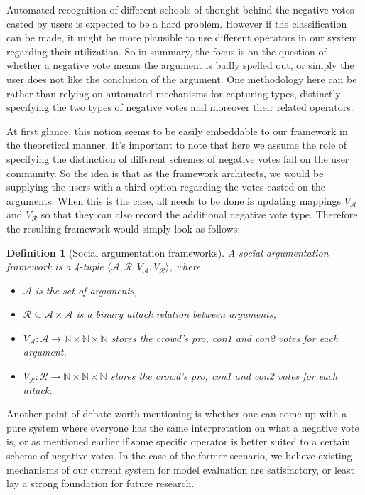 \documentclass{article}
\newtheorem{definition}{Definition}
\newcommand{\nat}{\mathbb{N}}   %
\newcommand{\args}{\mathcal{A}} %
\newcommand{\att}{\mathcal{R}}  %
\newcommand{\varg}{V_{\args}}   %
\newcommand{\vatt}{V_{\att}}   %
\begin{document}
Automated recognition of different schools of thought behind the negative votes casted by users is expected to be a hard problem. However if the classification can be made, it might be more plausible to use different operators in our system regarding their utilization. So in summary, the focus is on the question of whether a negative vote means the argument is badly spelled out, or simply the user does not like the {\color{red} conclusion of  the argument}. One methodology here can be rather than relying on automated mechanisms for capturing types, distinctly specifying the two types of negative votes and moreover their related operators. 

{\color{red} At first glance, this notion seems to be easily embeddable to our framework in the theoretical manner. It's important to note that here we assume the role of specifying the distinction of  different schemes of negative votes fall on the user community. So the idea is that as the framework architects, we would be supplying the users with a third option regarding the votes casted on the arguments. When this is the case, all needs to be done is updating mappings $\varg$ and $\vatt$ so that they can also record the additional negative vote type. Therefore the resulting framework would simply look as follows: 

\begin{definition}[Social argumentation frameworks]
A social argumentation framework is a 4-tuple $\langle \args, \att, \varg, \vatt \rangle$, where
\begin{itemize}
  \item $\mathcal{A}$ is the set of arguments,
  \item $\att \subseteq \args \times \args$ is a binary attack relation between arguments,
  \item $\varg : \args \to \nat \times \nat \times \nat$ stores the crowd's pro, con1 and con2 votes for each argument.
  \item $\vatt : \att \to \nat \times \nat \times \nat$ stores the crowd's pro,  con1 and con2 votes for each attack.
\end{itemize}
\end{definition}
}


Another point of debate worth mentioning is whether one can come up with a pure system where everyone has the same interpretation on what a negative vote is, or as mentioned earlier if some specific operator is better suited to a certain scheme of negative votes. In the case of the former scenario, we believe existing mechanisms of our current system for model evaluation are satisfactory, or least lay a strong foundation for future research.
\end{document}
